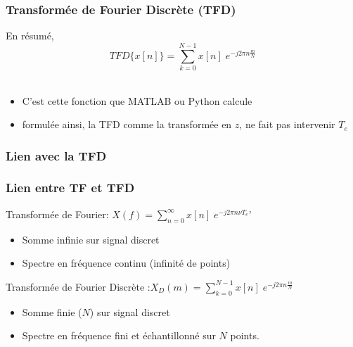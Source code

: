 \documentclass{beamer}
\begin{document}
\begin{frame}
\frametitle{Transformée de Fourier Discrète (TFD)}
En résumé,\\
\vspace{0.3cm} 
\[ TFD\{ x[n] \} =  \sum_{k = 0}^{N-1} x[n] \; e^{-j 2 \pi n \frac{m}{N}}  \] \\
\vspace{0.4cm}

\vspace{0.3cm}
\begin{itemize}
\item<2-> C'est cette fonction que MATLAB ou Python calcule
\vspace{0.3cm}
\item<3-> formulée ainsi, la TFD comme la transformée en $z$, ne fait pas intervenir $T_e$  
\end{itemize}

\end{frame}

\subsubsection{Lien avec la TFD}
\begin{frame} 
\frametitle{Lien entre TF et TFD}

Transformée de Fourier: $X(f) = \sum_{n = 0}^{\infty} x[n] \; e^{-j 2 \pi n \nu T_e}$' 
\begin{itemize}
\item<2-> Somme infinie sur signal discret
\item<3-> Spectre en fréquence continu (infinité de points)
\end{itemize}
\vspace{1cm}
Transformée de Fourier Discrète :$X_D(m) = \sum_{k = 0}^{N-1} x[n] \; e^{-j 2 \pi n \frac{m}{N} }$
\begin{itemize}
\item<2-> Somme finie ($N$) sur signal discret 
\item<3-> Spectre en fréquence fini et échantillonné sur $N$ points.
\end{itemize}

\end{frame}
\end{document}

